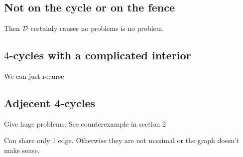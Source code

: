 \subsection{Not on the cycle or on the fence}
  Then $\mathcal{D}$ certainly causes no problems  is no problem.

\subsection{$4$-cycles with a complicated interior}
  We can just recurse

\subsection{Adjecent 4-cycles}
  Give huge problems. See counterexample in section 2

  Can share only 1 edge. Otherwise they are not maximal or the graph doesn't make sense.
